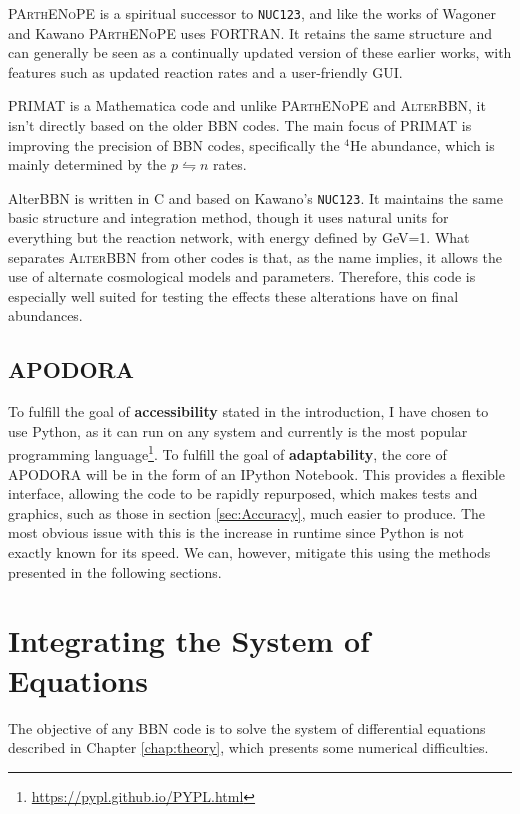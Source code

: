 \textsc{PArthENoPE}\cite{PArthENoPE} is a spiritual successor to \texttt{NUC123}, and like the works of Wagoner and Kawano \textsc{PArthENoPE} uses FORTRAN. It retains the same structure and can generally be seen as a continually updated version of these earlier works, with features such as updated reaction rates and a user-friendly GUI.

PRIMAT\cite{PRIMAT} is a Mathematica code and unlike \textsc{PArthENoPE} and \textsc{AlterBBN}, it isn't directly based on the older BBN codes. The main focus of PRIMAT is improving the precision of BBN codes, specifically the ${}^4$He abundance, which is mainly determined by the $p\leftrightharpoons n$ rates. 

AlterBBN\cite{AlterBBN} is written in C and based on Kawano's \texttt{NUC123}. It maintains the same basic structure and integration method, though it uses natural units for everything but the reaction network, with energy defined by GeV=1. What separates \textsc{AlterBBN} from other codes is that, as the name implies, it allows the use of alternate cosmological models and parameters. Therefore, this code is especially well suited for testing the effects these alterations have on final abundances.

\subsection{APODORA}
To fulfill the goal of \textbf{accessibility} stated in the introduction, I have chosen to use Python, as it can run on any system and currently is the most popular programming language\footnote{\url{https://pypl.github.io/PYPL.html}}. To fulfill the goal of \textbf{adaptability}, the core of APODORA will be in the form of an IPython Notebook\cite{IPython:2007}. This provides a flexible interface, allowing the code to be rapidly repurposed, which makes tests and graphics, such as those in section \ref{sec:Accuracy}, much easier to produce. 
The most obvious issue with this is the increase in runtime since Python is not exactly known for its speed. We can, however, mitigate this using the methods presented in the following sections.



\section{Integrating the System of Equations}
\label{sec:Solving}

The objective of any BBN code is to solve the system of differential equations described in Chapter \ref{chap:theory}, which presents some numerical difficulties. 

